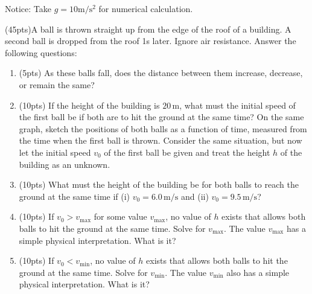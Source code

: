 \documentclass{article}
\begin{document}
Notice: Take $ g=10 \mathrm{m/s^2} $ for numerical calculation.

\begin{problem}
(45pts)A ball is thrown straight up from the edge of the roof of a building. A second ball is dropped from the roof 1s later. Ignore air resistance. Answer the following questions:

\begin{enumerate}[label=(\alph*)]
    \item (5pts) As these balls fall, does the distance between them increase, decrease, or remain the same?
    \item (10pts) If the height of the building is \(20\,\text{m}\), what must the initial speed of the first ball be if both are to hit the ground at the same time? On the same graph, sketch the positions of both balls as a function of time, measured from the time when the first ball is thrown. Consider the same situation, but now let the initial speed \(v_{0}\) of the first ball be given and treat the height \(h\) of the building as an unknown.
    \item (10pts) What must the height of the building be for both balls to reach the ground at the same time if (i) \(v_{0} = 6.0\,\text{m}/\text{s}\) and (ii) \(v_{0} = 9.5\,\text{m}/\text{s}\)?
    \item (10pts) If \(v_{0} > v_{\mathrm{max}}\) for some value \(v_{\mathrm{max}}\), no value of \(h\) exists that allows both balls to hit the ground at the same time. Solve for \(v_{\mathrm{max}}\). The value \(v_{\mathrm{max}}\) has a simple physical interpretation. What is it?
    \item (10pts) If \(v_{0} < v_{\mathrm{min}}\), no value of \(h\) exists that allows both balls to hit the ground at the same time. Solve for \(v_{\mathrm{min}}\). The value \(v_{\mathrm{min}}\) also has a simple physical interpretation. What is it?
\end{enumerate}
\end{problem}
\end{document}
